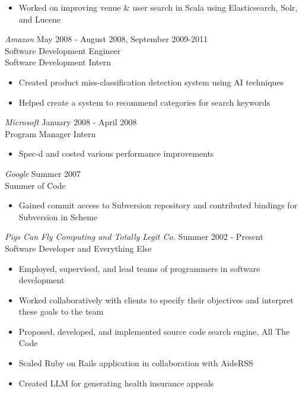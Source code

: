 \documentclass[10pt,line,margin=0.1]{newsres}
\begin{document}
\begin{resume}
\begin{itemize}
        \item Worked on improving venue \& user search in Scala using Elasticsearch, Solr, and Lucene
        \end{itemize}
        {\sl Amazon} \hfill            May 2008 - August 2008, September 2009-2011 \\
        Software Development Engineer \\
        Software Development Intern
        \begin{itemize}  \itemsep -2pt %
        \item Created product miss-classification detection system using AI techniques
        \item Helped create a system to recommend categories for search keywords
        \end{itemize} 
        {\sl Microsoft} \hfill        January 2008 - April 2008 \\
        Program Manager Intern
        \begin{itemize}
        \item Spec-d and costed various performance improvements
        \end{itemize} 
        {\sl Google} \hfill        Summer 2007 \\
        Summer of Code
        \begin{itemize}
        \item Gained commit access to Subversion repository and contributed bindings for Subversion in Scheme
        \end{itemize} 
        {\sl Pigs Can Fly Computing and Totally Legit Co.} \hfill Summer 2002 - Present \\
        Software Developer and Everything Else
        \begin{itemize}  \itemsep -2pt %
        \item{Employed, supervised, and lead teams of programmers in software development}
        \item{Worked collaboratively with clients to specify their objectives and interpret these goals to the team}
        \item{Proposed, developed, and implemented source code search engine, All The Code}
        \item{Scaled Ruby on Rails application in collaboration with AideRSS}
        \item{Created LLM for generating health insurance appeals}
        \end{itemize}


\end{resume}
\end{document}
